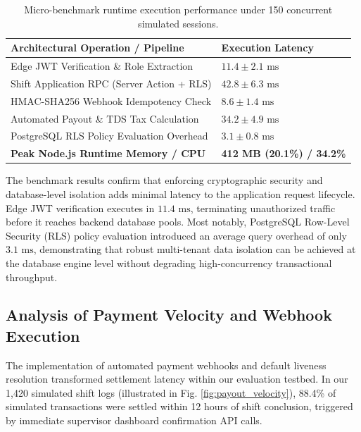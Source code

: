 \documentclass[conference]{IEEEtran}
\begin{document}
\begin{table}[htbp]
\caption{Micro-benchmark runtime execution performance under 150 concurrent simulated sessions.}
\begin{center}
\footnotesize
\setlength{\tabcolsep}{3pt}
\renewcommand{\arraystretch}{1.1}
\begin{tabular}{>{\raggedright\arraybackslash}p{} >{\raggedleft\arraybackslash}p{}}
\toprule
\textbf{Architectural Operation / Pipeline} & \textbf{Execution Latency} \\
\midrule
Edge JWT Verification \& Role Extraction & $11.4 \pm 2.1\text{ ms}$ \\
Shift Application RPC (Server Action + RLS) & $42.8 \pm 6.3\text{ ms}$ \\
HMAC-SHA256 Webhook Idempotency Check & $8.6 \pm 1.4\text{ ms}$ \\
Automated Payout \& TDS Tax Calculation & $34.2 \pm 4.9\text{ ms}$ \\
PostgreSQL RLS Policy Evaluation Overhead & $3.1 \pm 0.8\text{ ms}$ \\
\midrule
\textbf{Peak Node.js Runtime Memory / CPU} & \textbf{412 MB (20.1\%) / 34.2\%} \\
\bottomrule
\end{tabular}
\label{tab:technical_benchmarks}
\end{center}
\end{table}

The benchmark results confirm that enforcing cryptographic security and database-level isolation adds minimal latency to the application request lifecycle. Edge JWT verification executes in $11.4\text{ ms}$, terminating unauthorized traffic before it reaches backend database pools. Most notably, PostgreSQL Row-Level Security (RLS) policy evaluation introduced an average query overhead of only $3.1\text{ ms}$, demonstrating that robust multi-tenant data isolation can be achieved at the database engine level without degrading high-concurrency transactional throughput.

\subsection{Analysis of Payment Velocity and Webhook Execution}
The implementation of automated payment webhooks and default liveness resolution transformed settlement latency within our evaluation testbed. In our 1,420 simulated shift logs (illustrated in Fig. \ref{fig:payout_velocity}), 88.4\% of simulated transactions were settled within 12 hours of shift conclusion, triggered by immediate supervisor dashboard confirmation API calls. 
\end{document}
